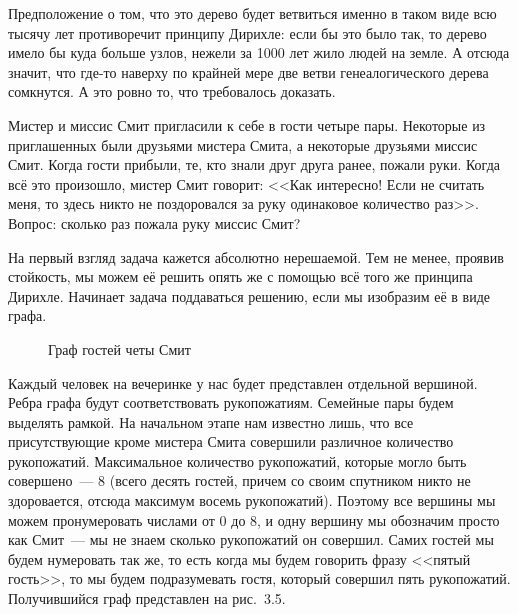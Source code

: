 \begin{example}
Предположение о том, что это дерево будет ветвиться именно в таком виде всю тысячу лет противоречит принципу Дирихле: если бы это было так, то дерево имело бы куда больше узлов, нежели за 1000 лет жило людей на земле. А отсюда значит, что где-то наверху по крайней мере две ветви генеалогического дерева сомкнутся. А это ровно то, что требовалось доказать.
\end{example}

\begin{example}
Мистер и миссис Смит пригласили к себе в гости четыре пары. Некоторые из приглашенных были друзьями мистера Смита, а некоторые друзьями миссис Смит. Когда гости прибыли, те, кто знали друг друга ранее, пожали руки. Когда всё это произошло, мистер Смит говорит: <<Как интересно! Если не считать меня, то здесь никто не поздоровался за руку одинаковое количество раз>>. Вопрос: сколько раз пожала руку миссис Смит?

На первый взгляд задача кажется абсолютно нерешаемой. Тем не менее, проявив стойкость, мы можем её решить опять же с помощью всё того же принципа Дирихле. Начинает задача поддаваться решению, если мы изобразим её в виде графа.

\begin{figure}[h]
\centering
{}
\caption{Граф гостей четы Смит}
\end{figure}

Каждый человек на вечеринке у нас будет представлен отдельной вершиной. Ребра графа будут соответствовать рукопожатиям. Семейные пары будем выделять рамкой. На начальном этапе нам известно лишь, что все присутствующие кроме мистера Смита совершили различное количество рукопожатий. Максимальное количество рукопожатий, которые могло быть совершено~--- 8 (всего десять гостей, причем со своим спутником никто не здоровается, отсюда максимум восемь рукопожатий). Поэтому все вершины мы можем пронумеровать числами от 0 до 8, и одну вершину мы обозначим просто как Смит~--- мы не знаем сколько рукопожатий он совершил. Самих гостей мы будем нумеровать так же, то есть когда мы будем говорить фразу <<пятый гость>>, то мы будем подразумевать гостя, который совершил пять рукопожатий. Получившийся граф представлен на рис.~3.5.


\end{example}
